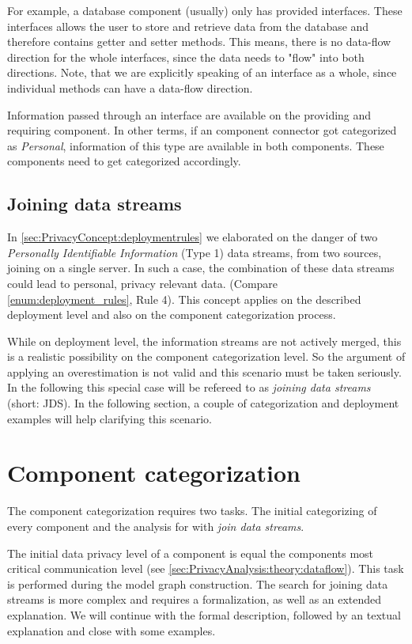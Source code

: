 For example, a database component (usually) only has provided interfaces. These interfaces allows the user to store and retrieve data from the database and therefore contains getter and setter methods. This means, there is no data-flow direction for the whole interfaces, since the data needs to "flow" into both directions. Note, that we are explicitly speaking of an interface as a whole, since individual methods can have a data-flow direction.

Information passed through an interface are available on the providing and requiring component. In other terms, if an component connector got categorized as \textit{Personal}, information of this type are available in both components. These components need to get categorized accordingly.

\subsection{Joining data streams}
\label{sec:PrivacyAnalysis:theory:jds}
In \autoref{sec:PrivacyConcept:deploymentrules} we elaborated on the danger of two \textit{Personally Identifiable Information} (Type 1) data streams, from two sources, joining on a single server. In such a case, the combination of these data streams could lead to personal, privacy relevant data. (Compare \autoref{enum:deployment_rules}, Rule 4). This concept applies on the described deployment level and also on the component categorization process.

While on deployment level, the information streams are not actively merged, this is a realistic possibility on the component categorization level. So the argument of applying an overestimation is not valid and this scenario must be taken seriously. In the following this special case will be refereed to as \textit{joining data streams} (short: JDS). In the following section, a couple of categorization and deployment examples will help clarifying this scenario.


\section{Component categorization}
\label{sec:PrivacyAnalysis:categorization}

The component categorization requires two tasks. The initial categorizing of every component and the analysis for with \textit{join data streams}.

The initial data privacy level of a component is equal the components most critical communication level (see \autoref{sec:PrivacyAnalysis:theory:dataflow}). This task is performed during the model graph construction. The search for joining data streams is more complex and requires a formalization, as well as an extended explanation. We will continue with the formal description, followed by an textual explanation and close with some examples.

